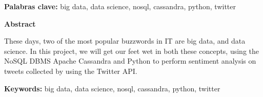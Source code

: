 \documentclass[12pt,a4paper,oneside,fleqn]{tmarticle}
\begin{document}
\vspace{0.5cm}
\textbf{Palabras clave: } big data, data science, nosql, cassandra, python, twitter

\clearpage
\textbf{Abstract}
\vspace{0.5cm}

These days, two of the most popular buzzwords in IT are big data, and data
science. In this project, we will get our feet wet in both these concepts, using
the NoSQL DBMS Apache Cassandra and Python to perform sentiment analysis on
tweets collected by using the Twitter API.

\vspace{0.5cm}
\textbf{Keywords: } big data, data science, nosql, cassandra, python, twitter

\clearpage
\thispagestyle{empty}
\tableofcontents
\clearpage
\thispagestyle{empty}
\listoffigures
\clearpage
\listoftables
\clearpage
{}




%
% 
% 

% 

\nocite{*}
\clearpage
\glsaddall
\printglossary[nonumberlist]
\printbibliography[heading=bibintoc]
\end{document}
